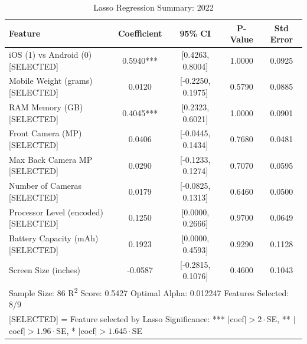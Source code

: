 \documentclass[12pt]{article}
\begin{document}
\begin{table}[ht]
\centering
\caption{Lasso Regression Summary: 2022}
\begin{tabular}{lcccc}
\toprule
Feature & Coefficient & 95\% CI & P-Value & Std Error \\
\midrule
iOS (1) vs Android (0) [SELECTED] & 0.5940*** & {[0.4263, 0.8004]} & 1.0000 & 0.0925 \\
Mobile Weight (grams) [SELECTED] & 0.0120 & {[-0.2250, 0.1975]} & 0.5790 & 0.0885 \\
RAM Memory (GB) [SELECTED] & 0.4045*** & {[0.2323, 0.6021]} & 1.0000 & 0.0901 \\
Front Camera (MP) [SELECTED] & 0.0406 & {[-0.0445, 0.1434]} & 0.7680 & 0.0481 \\
Max Back Camera MP [SELECTED] & 0.0290 & {[-0.1233, 0.1274]} & 0.7070 & 0.0595 \\
Number of Cameras [SELECTED] & 0.0179 & {[-0.0825, 0.1313]} & 0.6460 & 0.0500 \\
Processor Level (encoded) [SELECTED] & 0.1250 & {[0.0000, 0.2666]} & 0.9700 & 0.0649 \\
Battery Capacity (mAh) [SELECTED] & 0.1923 & {[0.0000, 0.4593]} & 0.9290 & 0.1128 \\
Screen Size (inches) & -0.0587 & {[-0.2815, 0.1076]} & 0.4600 & 0.1043 \\
\midrule
\multicolumn{5}{l}{\footnotesize Sample Size: 86 \quad R\textsuperscript{2} Score: 0.5427 \quad Optimal Alpha: 0.012247 \quad Features Selected: 8/9} \\
\multicolumn{5}{l}{\footnotesize [SELECTED] = Feature selected by Lasso \quad Significance: *** $|$coef$|>2\cdot$SE, ** $|$coef$|>1.96\cdot$SE, * $|$coef$|>1.645\cdot$SE} \\
\bottomrule
\end{tabular}
\end{table}
\end{document}
